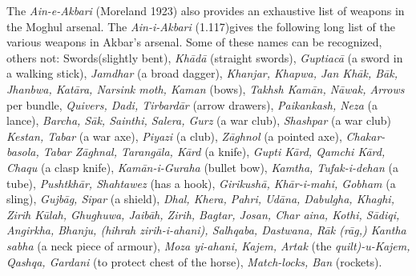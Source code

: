 The \textit{Ain-e-Akbari} (Moreland 1923) also provides an exhaustive list of weapons in the Moghul arsenal. The\textit{ Ain-i-Akbari }(1.117)gives the following long list of the various weapons in Akbar's arsenal. Some of these names can be recognized, others not: Swords(slightly bent), \textit{Khādā }(straight swords), \textit{Guptiacā }(a sword in a walking stick), \textit{Jamdhar }(a broad dagger), \textit{Khanjar, Khapwa, Jan Khāk, Bāk, Jhanbwa, Katāra, Narsink moth, Kaman }(bows), \textit{Takhsh Kamān, Nāwak, Arrows }per bundle, \textit{Quivers, Dadi, Tirbardār }(arrow drawers), \textit{Paikankash, Neza }(a lance), \textit{Barcha, Sāk, Sainthi, Salera, Gurz }(a war club), \textit{Shashpar }(a war club) \textit{Kestan, Tabar }(a war axe), \textit{Piyazi }(a club), \textit{Zāghnol }(a pointed axe), \textit{Chakar-basola, Tabar Zāghnal, Tarangāla, Kārd }(a knife), \textit{Gupti Kārd, Qamchi Kārd, Chaqu }(a clasp knife), \textit{Kamān-i-Guraha }(bullet bow), \textit{Kamtha, Tufak-i-dehan }(a tube), \textit{Pushtkhār, Shahtawez }(has a hook), \textit{Girikushā, Khār-i-mahi, Gobham }(a sling), \textit{Gujbāg, Sipar }(a shield), \textit{Dhal, Khera, Pahri, Udāna, Dabulgha, Khaghi, Zirih Kūlah, Ghughuwa, Jaibāh, Zirih, Bagtar, Josan, Char aina, Kothi, Sādiqi, Angirkha, Bhanju, (hihrah zirih-i­-ahani), Salhqaba, Dastwana, Rāk (rāg,) Kantha sabha }(a neck piece of armour), \textit{Moza yi-ahani, Kajem, Artak }(the \textit{quilt)-u-Kajem, Qashqa, Gardani }(to protect chest of the horse), \textit{Match-locks, Ban }(rockets).


